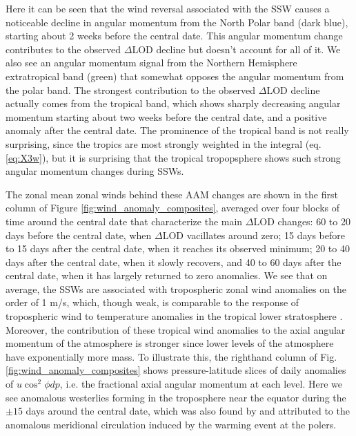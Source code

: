 \documentclass[draft,jgrga]{agutex}
\begin{document}
\begin{article}
Here it can be seen that the wind reversal associated with the SSW causes a noticeable decline in angular momentum from the North Polar band  {(dark blue)}, starting about 2 weeks before the central date.
 {This angular momentum change contributes to the observed $\Delta$LOD decline but doesn't account for all of it.}
 {We also see an  angular momentum signal from the Northern Hemisphere extratropical band (green) that somewhat opposes the angular momentum from the polar band.}
 {The strongest contribution to the observed $\Delta$LOD decline actually comes from the tropical band, which shows sharply decreasing angular momentum starting about two weeks before the central date, and a positive anomaly after the central date.
The prominence of the tropical band is not really surprising, since the tropics are most strongly weighted in the integral} (eq. \ref{eq:X3w}),  {but it is surprising that the tropical tropopsphere  {shows such strong} angular momentum changes during SSWs.} 

The zonal mean zonal winds behind these AAM changes are shown in  {the first column of} Figure \ref{fig:wind_anomaly_composites}, averaged over four blocks of time around the central date that characterize the main $\Delta$LOD changes:  {60 to 20 days before the central date, when $\Delta$LOD vacillates around zero; 15 days before to 15 days after the central date, when it reaches its observed minimum; 20 to 40 days after the central date, when it slowly recovers, and 40 to 60 days after the central date, when it has largely returned to zero anomalies.}  
 {We see that on average, the SSWs are associated with} tropospheric zonal wind anomalies on the order of 1 m/s, which,  {though weak, is comparable} to the response of tropospheric wind to temperature anomalies in the tropical lower stratosphere \citet{Haigh2005}.
% 
 {Moreover, the contribution of these tropical wind anomalies} to the axial angular momentum of the atmosphere is stronger since lower levels of the atmosphere have exponentially more mass.
To illustrate this, the righthand column of Fig. \ref{fig:wind_anomaly_composites} shows pressure-latitude slices of daily anomalies of $u \cos^2 \phi dp$, i.e. the fractional axial angular momentum at each level.
 {Here we see anomalous westerlies forming in the troposphere near the equator during the $\pm 15$ days around the central date, which was also found by} \citet{kodera2006}  {and attributed to the anomalous meridional circulation induced by the warming event at the polers.}


\end{article}
\end{document}

